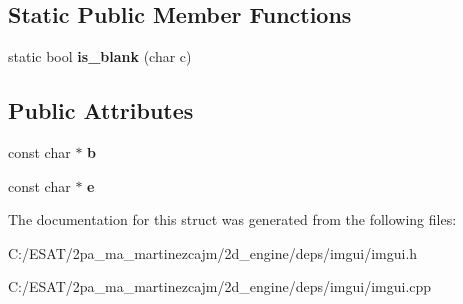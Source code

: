 \subsection*{Static Public Member Functions}
\begin{DoxyCompactItemize}
\item 
\mbox{\label{struct_im_gui_text_filter_1_1_text_range_ade5e15395ae2bcef6b37bf22a68cc6e6}} 
static bool {\bfseries is\+\_\+blank} (char c)
\end{DoxyCompactItemize}
\subsection*{Public Attributes}
\begin{DoxyCompactItemize}
\item 
\mbox{\label{struct_im_gui_text_filter_1_1_text_range_a705cf9c8fb0796b3bab9cf20cb18b0ca}} 
const char $\ast$ {\bfseries b}
\item 
\mbox{\label{struct_im_gui_text_filter_1_1_text_range_a20daef0e47167d49a017d8f54cb7c607}} 
const char $\ast$ {\bfseries e}
\end{DoxyCompactItemize}


The documentation for this struct was generated from the following files\+:\begin{DoxyCompactItemize}
\item 
C\+:/\+E\+S\+A\+T/2pa\+\_\+ma\+\_\+martinezcajm/2d\+\_\+engine/deps/imgui/imgui.\+h\item 
C\+:/\+E\+S\+A\+T/2pa\+\_\+ma\+\_\+martinezcajm/2d\+\_\+engine/deps/imgui/imgui.\+cpp\end{DoxyCompactItemize}
